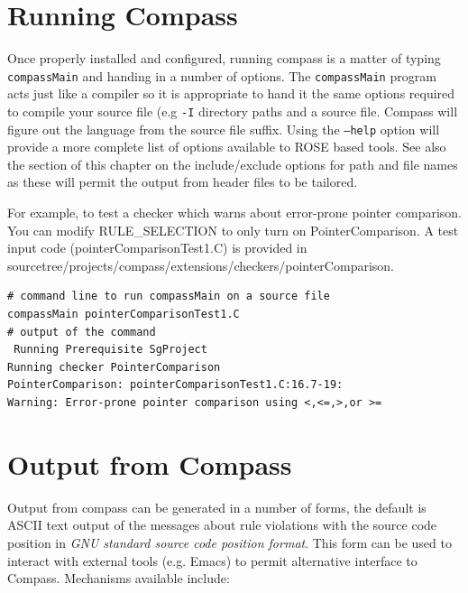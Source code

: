 \section{Running Compass}

Once properly installed and configured, running compass is a matter of typing {\tt compassMain} 
and handing in a number of options. The {\tt compassMain} program acts just 
like a compiler so it is appropriate to hand it the same options required to 
compile your source file (e.g {\tt -I} directory paths and a source file.  
Compass will figure out the language from the source file suffix.  
Using the {\tt --help} option will provide a more complete list of options 
available to ROSE based tools.  See also the section of this chapter on the 
include/exclude options for path and file names as these will permit the 
output from header files to be tailored.

For example, to test a checker which warns about error-prone pointer
comparison. You can modify RULE\_SELECTION to only turn on
PointerComparison. A test input code (pointerComparisonTest1.C) is provided
in sourcetree/projects/compass/extensions/checkers/pointerComparison. 
\begin{verbatim}
# command line to run compassMain on a source file
compassMain pointerComparisonTest1.C
# output of the command
 Running Prerequisite SgProject
Running checker PointerComparison
PointerComparison: pointerComparisonTest1.C:16.7-19: 
Warning: Error-prone pointer comparison using <,<=,>,or >=
\end{verbatim}

\section{Output from Compass}

   Output from compass can be generated in a number of forms, the default is
ASCII text output of the messages about rule violations with the source code
position in {\it GNU standard source code position format}.  This form can be
used to interact with external tools (e.g. Emacs) to permit alternative
interface to Compass.  Mechanisms available include:


